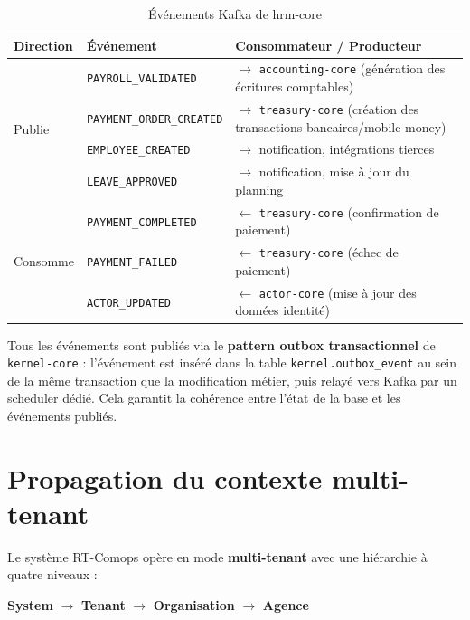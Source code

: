 \documentclass[a4paper,12pt,openany]{book}
\begin{document}
    \begin{table}[H]
        \centering
        \caption{Événements Kafka de hrm-core}
        \label{tab:events-kafka}
        \begin{tabularx}{\textwidth}{llX}
    \toprule
    \textbf{Direction} & \textbf{Événement} & \textbf{Consommateur / Producteur} \\
    \midrule
    \multirow{4}{*}{Publie} & \texttt{PAYROLL\_VALIDATED}       & $\rightarrow$ \texttt{accounting-core} (génération des écritures comptables) \\
    & \texttt{PAYMENT\_ORDER\_CREATED}  & $\rightarrow$ \texttt{treasury-core} (création des transactions bancaires/mobile money) \\
    & \texttt{EMPLOYEE\_CREATED}        & $\rightarrow$ notification, intégrations tierces \\
    & \texttt{LEAVE\_APPROVED}          & $\rightarrow$ notification, mise à jour du planning \\
    \midrule
    \multirow{3}{*}{Consomme} & \texttt{PAYMENT\_COMPLETED}     & $\leftarrow$ \texttt{treasury-core} (confirmation de paiement) \\
    & \texttt{PAYMENT\_FAILED}        & $\leftarrow$ \texttt{treasury-core} (échec de paiement) \\
    & \texttt{ACTOR\_UPDATED}         & $\leftarrow$ \texttt{actor-core} (mise à jour des données identité) \\
    \bottomrule
        \end{tabularx}
    \end{table}

    Tous les événements sont publiés via le \textbf{pattern outbox transactionnel} de \texttt{kernel-core} : l'événement est inséré dans la table \texttt{kernel.outbox\_event} au sein de la même transaction que la modification métier, puis relayé vers Kafka par un scheduler dédié. Cela garantit la cohérence entre l'état de la base et les événements publiés.


    \section{Propagation du contexte multi-tenant}

    Le système RT-Comops opère en mode \textbf{multi-tenant} avec une hiérarchie à quatre niveaux :

    \begin{center}
        \textbf{System} $\rightarrow$ \textbf{Tenant} $\rightarrow$ \textbf{Organisation} $\rightarrow$ \textbf{Agence}
    \end{center}
\end{document}
